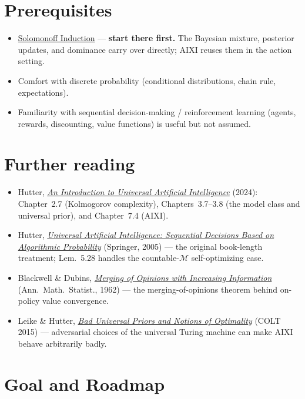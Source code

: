 \documentclass[fontsize=11pt, parskip=half]{scrartcl}
\newcommand{\cM}{\mathcal{M}}
\begin{document}
\section*{Prerequisites}

\begin{itemize}
    \item \href{/agency/solomonoff-induction}{Solomonoff Induction} ---
    \textbf{start there first.} The Bayesian mixture, posterior updates, and
    dominance carry over directly; AIXI reuses them in the action setting.
    \item Comfort with discrete probability (conditional distributions, chain rule,
    expectations).
    \item Familiarity with sequential decision-making / reinforcement learning
    (agents, rewards, discounting, value functions) is useful but not assumed.
\end{itemize}

\section*{Further reading}

\begin{itemize}
    \item Hutter, \href{https://www.hutter1.net/publ/uaibook2.pdf}{\emph{An
    Introduction to Universal Artificial Intelligence}} (2024): Chapter~2.7
    (Kolmogorov complexity), Chapters~3.7--3.8 (the model class and universal
    prior), and Chapter~7.4 (AIXI).
    \item Hutter, \href{http://www.hutter1.net/ai/uaibook.htm}{\emph{Universal
    Artificial Intelligence: Sequential Decisions Based on Algorithmic
    Probability}} (Springer, 2005) --- the original book-length treatment;
    Lem.~5.28 handles the countable-$\cM$ self-optimizing case.
    \item Blackwell \& Dubins, \href{https://doi.org/10.1214/aoms/1177704456}{\emph{Merging
    of Opinions with Increasing Information}} (Ann.\ Math.\ Statist., 1962) --- the
    merging-of-opinions theorem behind on-policy value convergence.
    \item Leike \& Hutter, \href{https://arxiv.org/abs/1510.04931}{\emph{Bad
    Universal Priors and Notions of Optimality}} (COLT 2015) --- adversarial
    choices of the universal Turing machine can make AIXI behave arbitrarily badly.
\end{itemize}

\section*{Goal and Roadmap}
\end{document}
